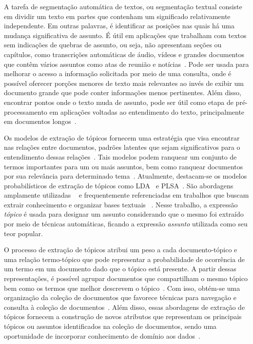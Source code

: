 A tarefa de segmentação automática de textos, ou segmentação textual consiste em dividir um texto em partes que contenham um significado relativamente independente. Em outras palavras, é identificar as posições nas quais há uma mudança significativa de assunto. É útil em aplicações que trabalham com textos sem indicações de quebras de assunto, ou seja, não apresentam seções ou capítulos, como transcrições automáticas de áudio, vídeos e grandes documentos que contêm vários assuntos como atas de reunião e notícias~\cite{Aggarwal2018, bokaei2015, sakahara2014, misra2009, eisenstein2008, choi2000}.
Pode ser usada para melhorar o acesso a informação solicitada por meio de uma consulta, onde é possível oferecer porções menores de texto mais relevantes ao invés de exibir um documento grande que pode conter informações menos pertinentes.  Além disso, encontrar pontos onde o texto muda de assunto, pode ser útil como etapa de pré-processamento em aplicações voltadas ao entendimento do texto, principalmente em documentos longos~\cite{Choi2000}.




Os modelos de extração de tópicos fornecem uma estratégia que visa encontrar nas relações entre documentos, padrões latentes que sejam significativos para o entendimento dessas relações~\cite{Wei2007}. Tais modelos podem ranquear um conjunto de termos importantes para um ou mais assuntos, bem como ranquear documentos por sua relevância para determinado tema~\cite{Faleiros2016,Xing2009}.
Atualmente, destacam-se os modelos probabilísticos de extração de tópicos como LDA~\cite{Blei2003} e PLSA~\cite{Hofmann1999}. São abordagens amplamente utilizadas ~\cite{DZhu20122} e frequentemente referenciadas em trabalhos que buscam extrair conhecimento e organizar bases textuais ~\cite{Aggarwal2018, OCallaghan2015, Steyvers2007}.  
%
%
Nesse trabalho, a expressão \textit{tópico} é usada para designar um assunto considerando que o mesmo foi extraído por meio de técnicas automáticas, ficando a expressão \textit{assunto} utilizada como seu teor popular. 

O processo de extração de tópicos atribui um peso a cada documento-tópico e uma relação termo-tópico que pode representar a probabilidade de ocorrência de um termo em um documento dado que o tópico está presente. A partir dessas representações, é possível agrupar documentos que compartilham o mesmo tópico bem como os termos que melhor descrevem o tópico~\cite{Aggarwal2018}. Com isso, obtém-se uma organização da coleção de documentos que favorece técnicas para navegação e consulta à coleção de documentos~\cite{Maracini2010}. 
% 
Além disso, essas abordagens de extração de tópicos fornecem a construção de novos atributos que representam os principais tópicos ou assuntos identificados na coleção de documentos, sendo uma oportunidade de incorporar conhecimento de domínio aos dados~\cite{Guyon2003}. 

